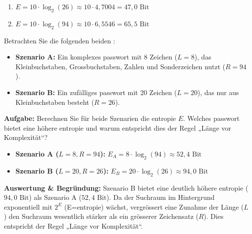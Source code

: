 \documentclass[12pt,a4paper]{article}
\begin{document}
\begin{solutionbox}[Musterlösung 2.3.1.2.1]
\begin{enumerate}[label=\alph*)]
    \item $E = 10 \cdot \log_2(26) \approx 10 \cdot 4{,}7004 = 47{,}0 \text{ Bit}$
    \item $E = 10 \cdot \log_2(94) \approx 10 \cdot 6{,}5546 = 65{,}5 \text{ Bit}$
\end{enumerate}
\end{solutionbox}

\begin{taskbox}
Betrachten Sie die folgenden beiden :
\begin{itemize}
    \item \textbf{Szenario A:} Ein komplexes \gls{passwort} mit 8 Zeichen ($L = 8$), \newline das \mbox{Kleinbuchstaben}, \mbox{Grossbuchstaben}, \mbox{Zahlen} und \mbox{Sonderzeichen} nutzt \newline($R = 94$).
    \item \textbf{Szenario B:} Ein zufälliges \gls{passwort} mit 20 Zeichen ($L = 20$), das nur aus Kleinbuchstaben besteht ($R = 26$).
\end{itemize}
\textbf{Aufgabe:} Berechnen Sie für beide Szenarien die \gls{entropie} $E$. Welches \gls{passwort} bietet eine höhere \gls{entropie} und warum entspricht dies der Regel „Länge vor \mbox{Komplexität}“?
\end{taskbox}

\begin{solutionbox}[Musterlösung 2.3.1.2.2]
\begin{itemize}
    \item \textbf{Szenario A ($L=8, R=94$):} $E_A = 8 \cdot \log_2(94) \approx 52{,}4 \text{ Bit}$
    \item \textbf{Szenario B ($L=20, R=26$):} $E_B = 20 \cdot \log_2(26) \approx 94{,}0 \text{ Bit}$
\end{itemize}
\textbf{Auswertung \& Begründung:} Szenario B bietet eine deutlich höhere \gls{entropie} ($94{,}0 \text{ Bit}$) als Szenario A ($52{,}4 \text{ Bit}$). Da der Suchraum im Hintergrund exponentiell mit $2^E$ (E=\gls{entropie}) wächst, vergrössert eine Zunahme der Länge ($L$) den Suchraum \mbox{wesentlich} stärker als ein grösserer Zeichensatz ($R$). Dies entspricht der Regel „Länge vor \mbox{Komplexität}“.
\end{solutionbox}
\end{document}
